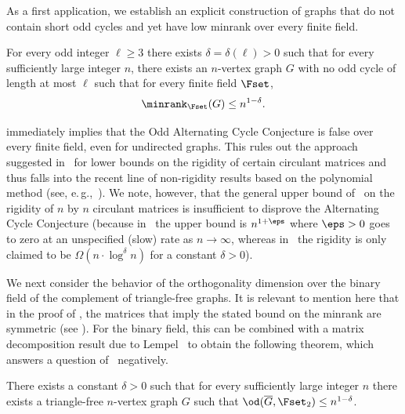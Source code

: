 As a first application, we establish an explicit construction of graphs that do not contain short odd cycles and yet have low minrank over every finite field.
\begin{theorem}\label{thm:Intro_Cycles}
For every odd integer $\ell \geq 3$ there exists $\delta = \delta(\ell) >0$ such that for every sufficiently large integer $n$, there exists an $n$-vertex graph $G$ with no odd cycle of length at most $\ell$ such that for every finite field $\Fset$,
\[{\minrank}_{\Fset}(G) \leq n^{1-\delta}.\]
\end{theorem}
\noindent
{} immediately implies that the Odd Alternating Cycle Conjecture is false over every finite field, even for undirected graphs.
This rules out the approach suggested in~\cite{CodenottiPR00} for lower bounds on the rigidity of certain circulant matrices and thus falls into the recent line of non-rigidity results based on the polynomial method (see, e.\,g.,~\cite{AlmanW17,dvir2019matrix,DvirL19}).
We note, however, that the general upper bound of~\cite{DvirL19} on the rigidity of $n$ by $n$ circulant matrices
%
%
%
is insufficient to disprove the Alternating Cycle Conjecture
(because in~\cite{DvirL19} the upper bound is $n^{1+\eps}$
%
where $\eps > 0$ goes to zero at an unspecified (slow) rate
as $n\to\infty$,  %
whereas in~\cite{CodenottiPR00} the rigidity is only claimed to be
%
%
$\Omega(n \cdot \log^\delta n)$ for a constant $\delta > 0$).

We next consider the behavior of the orthogonality dimension over the binary field of the complement of triangle-free graphs.
It is relevant to mention here that in the proof of , the matrices that imply the stated bound on the minrank are symmetric (see ). For the binary field, this can be combined with a matrix decomposition result due to Lempel~\cite{Lempel75} to obtain the following theorem, which answers a question of~\cite{CodenottiPR00} negatively.
\begin{theorem}\label{thm:IntroTriangleFree}
There exists a constant $\delta >0$ such that for every sufficiently large integer $n$ there exists a triangle-free $n$-vertex graph $G$ such that $\od(\overline{G},\Fset_2) \leq n^{1-\delta}$.
\end{theorem}

